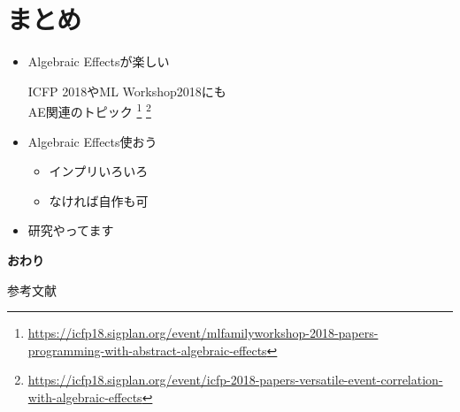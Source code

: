 \documentclass[unicode,compress,14pt,CJK%
\directlua{
    handout = os.getenv"HANDOUT"
    local _ = handout and tex.print(",handout")
},t]{beamer}
\begin{document}
\section{まとめ}
\begin{frame}
    \frametitlesec

    \begin{itemize}
        \item[\coloremoji{🌋}] Algebraic Effectsが楽しい

            ICFP 2018やML Workshop2018にも\\
            AE関連のトピック%
            \footnote{\url{https://icfp18.sigplan.org/event/mlfamilyworkshop-2018-papers-programming-with-abstract-algebraic-effects}}%
            \footnote{\url{https://icfp18.sigplan.org/event/icfp-2018-papers-versatile-event-correlation-with-algebraic-effects}}

        \item[\coloremoji{🉐}] Algebraic Effects使おう

            \begin{itemize}
                \item[\coloremoji{🛠}] インプリいろいろ
                \item[\coloremoji{💪}] なければ自作も可
            \end{itemize}

        \item[\coloremoji{👨‍💻}] 研究やってます
    \end{itemize}
\end{frame}

\nofootertrue
\begin{frame}
    \vfill
    \centering
    {\Huge \textbf{おわり}}
    \vfill
\end{frame}

    \nocite{*}
\begin{frame}{参考文献}
    \scriptsize
    \printbibliography[heading=none]
\end{frame}
\end{document}
